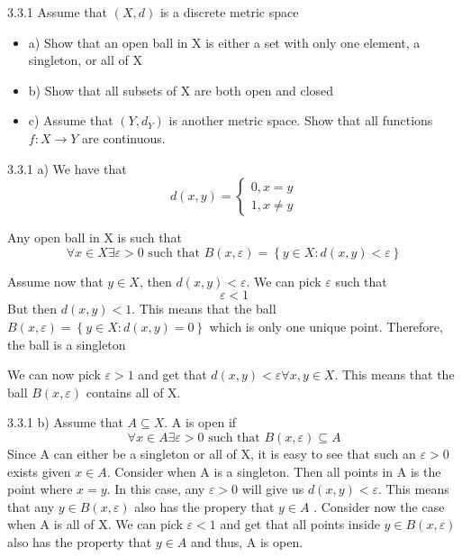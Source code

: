 \documentclass[a4paper,norsk]{article}
\renewcommand{\epsilon}{\varepsilon}
\begin{document}
\begin{oppgavebox}{3.3.1}{}
Assume that $ \left( X, d \right)  $ is a discrete metric space
\begin{itemize}
  \item a) Show that an open ball in X is either a set with only one element, a singleton, or all of X
  \item b) Show that all subsets of X are both open and closed
  \item c) Assume that $(Y, d_Y )$ is another metric space. Show that all functions $f : X \rightarrow Y$ are continuous.
\end{itemize}
\begin{proofbox}{3.3.1 a)}{}
  We have that 
  \[
      d(x,y) = \begin{cases}
        0, x=y\\
        1, x\neq y
      \end{cases}
  \]
  
  Any open ball in X is such that 
  \[
      \forall x \in X \exists \epsilon > 0 \text{ such that } B(x, \epsilon ) = \left\{ y \in X : d(x, y) < \epsilon  \right\} 
  \]
  
  Assume now that $ y \in X $, then $ d(x, y) < \epsilon  $. We can pick $ \epsilon  $ such that
  \[
      \epsilon < 1
  \]
  But then $ d(x, y) < 1 $. This means that the ball $ B(x, \epsilon ) = \left\{ y \in X : d(x, y) = 0 \right\}   $  which is only one unique point. Therefore, the ball is a singleton


  We can now pick $ \epsilon > 1 $  and get that $ d(x, y) < \epsilon  \forall x, y \in  X$. This means that the ball $ B(x, \epsilon  )$ contains all of X. 
    
\end{proofbox}

\begin{proofbox}{3.3.1 b)}{}
  Assume that $ A \subseteq X $. A is open if 
  \[
      \forall x \in A \exists \epsilon > 0 \text{ such that } B(x, \epsilon ) \subseteq A
  \]
  Since A can either be a singleton or all of X, it is easy to see that such an $ \epsilon > 0 $ exists given $ x \in A $. Consider when A is a singleton. Then all points in A is the point where $ x=y $. In this case, any $ \epsilon > 0 $ will give us $ d(x, y) < \epsilon  $. This means that any $ y \in B(x, \epsilon ) $ also has the propery that $ y \in A $  . Consider now the case when A is all of X. We can pick $ \epsilon < 1 $ and get that all points inside $ y \in B(x, \epsilon ) $ also has the property that $ y \in A $ and thus, A is open.



\end{proofbox}
\end{oppgavebox}
\end{document}
